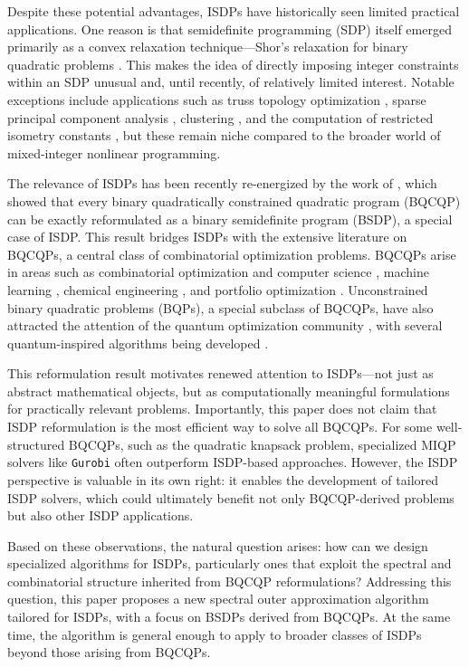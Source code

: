\documentclass{article}
\begin{document}
Despite these potential advantages, ISDPs have historically seen limited practical applications.
One reason is that semidefinite programming (SDP) itself emerged primarily as a convex relaxation technique—Shor's relaxation for binary quadratic problems \cite{shor1987quadratic}.
This makes the idea of directly imposing integer constraints within an SDP unusual and, until recently, of relatively limited interest.
Notable exceptions include applications such as truss topology optimization \cite{gally2018framework}, sparse principal component analysis \cite{ li2024exact}, clustering \cite{peng2007approximating,piccialli2022sos}, and the computation of restricted isometry constants \cite{gally2016computing}, but these remain niche compared to the broader world of mixed-integer nonlinear programming.

The relevance of ISDPs has been recently re-energized by the work of \citet{de2023integrality}, which showed that every binary quadratically constrained quadratic program (BQCQP) can be exactly reformulated as a binary semidefinite program (BSDP), a special case of ISDP.
This result bridges ISDPs with the extensive literature on BQCQPs, a central class of combinatorial optimization problems. BQCQPs arise in areas such as combinatorial optimization and computer science \cite{boros1991max,dur2021conic}, machine learning \cite{fortunato2010community,park2017general}, chemical engineering \cite{biegler2004retrospective}, and portfolio optimization \cite{bodnar2013equivalence,deng2013branch}.
Unconstrained binary quadratic problems (BQPs), a special subclass of BQCQPs, have also attracted the attention of the quantum optimization community \cite{domino2022quadratic,mazumder2024five}, with several quantum-inspired algorithms being developed \cite{brown2022copositive}.

This reformulation result motivates renewed attention to ISDPs—not just as abstract mathematical objects, but as computationally meaningful formulations for practically relevant problems.
Importantly, this paper does not claim that ISDP reformulation is the most efficient way to solve all BQCQPs. For some well-structured BQCQPs, such as the quadratic knapsack problem, specialized MIQP solvers like \texttt{Gurobi} often outperform ISDP-based approaches. However, the ISDP perspective is valuable in its own right: it enables the development of tailored ISDP solvers, which could ultimately benefit not only BQCQP-derived problems but also other ISDP applications.

Based on these observations, the natural question arises: how can we design specialized algorithms for ISDPs, particularly ones that exploit the spectral and combinatorial structure inherited from BQCQP reformulations? Addressing this question, this paper proposes a new spectral outer approximation algorithm tailored for ISDPs, with a focus on BSDPs derived from BQCQPs. At the same time, the algorithm is general enough to apply to broader classes of ISDPs beyond those arising from BQCQPs.
\end{document}
